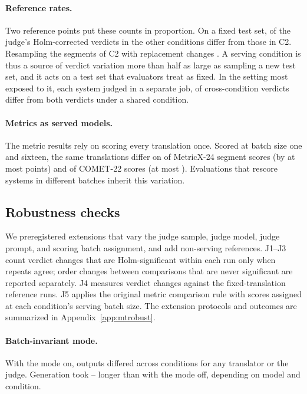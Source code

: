 \paragraph{Reference rates.} Two reference points put these counts in proportion. On a fixed test set, \XServRate{} of the judge's Holm-corrected verdicts in the other conditions differ from those in C2. Resampling the segments of C2 with replacement changes \XBootRate{}. A serving condition is thus a source of verdict variation more than half as large as sampling a new test set, and it acts on a test set that evaluators treat as fixed. In the setting most exposed to it, each system judged in a separate job, \XCrossDiffer{} of \XCrossN{} cross-condition verdicts differ from both verdicts under a shared condition.

\paragraph{Metrics as served models.} The metric results rely on scoring every translation once. Scored at batch size one and sixteen, the same translations differ on \MtvSideMxShare{} of MetricX-24 segment scores (by at most \MtvSideMxMax{} points) and \MtvSideCometShare{} of COMET-22 scores (at most \MtvSideCometMax{}). Evaluations that rescore systems in different batches inherit this variation.

\subsection{Robustness checks}
We preregistered extensions that vary the judge sample, judge model, judge prompt, and scoring batch assignment, and add non-serving references. J1--J3 count verdict changes that are Holm-significant within each run only when repeats agree; order changes between comparisons that are never significant are reported separately. J4 measures verdict changes against the fixed-translation reference runs. J5 applies the original metric comparison rule with scores assigned at each condition's serving batch size. The extension protocols and outcomes are summarized in Appendix~\ref{app:mtrobust}.

\paragraph{Batch-invariant mode.} With the mode on, \MtvBiDiffer{} outputs differed across conditions for any translator or the judge. Generation took \MtvTimeMin{}--\MtvTimeMax{} longer than with the mode off, depending on model and condition.

